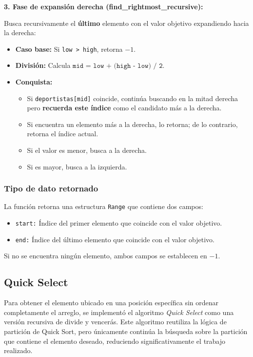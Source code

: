 \textbf{3. Fase de expansión derecha (find\_rightmost\_recursive):}

Busca recursivamente el \textbf{último} elemento con el valor objetivo expandiendo hacia la derecha:

\begin{itemize}
    \item \textbf{Caso base:} Si \texttt{low > high}, retorna $-1$.
    \item \textbf{División:} Calcula \(\texttt{mid = low + (high - low) / 2}\).
    \item \textbf{Conquista:} 
    \begin{itemize}
        \item Si \texttt{deportistas[mid]} coincide, continúa buscando en la mitad derecha pero \textbf{recuerda este índice} como el candidato más a la derecha.
        \item Si encuentra un elemento más a la derecha, lo retorna; de lo contrario, retorna el índice actual.
        \item Si el valor es menor, busca a la derecha.
        \item Si es mayor, busca a la izquierda.
    \end{itemize}
\end{itemize}

\subsubsection{Tipo de dato retornado}

La función retorna una estructura \texttt{Range} que contiene dos campos:

\begin{itemize}
    \item \texttt{start:} Índice del primer elemento que coincide con el valor objetivo.
    \item \texttt{end:} Índice del último elemento que coincide con el valor objetivo.
\end{itemize}

Si no se encuentra ningún elemento, ambos campos se establecen en $-1$.

\subsection{Quick Select}

Para obtener el elemento ubicado en una posición específica sin ordenar completamente el arreglo, se implementó el algoritmo \textit{Quick Select} como una versión recursiva de divide y vencerás. Este algoritmo reutiliza la lógica de partición de Quick Sort, pero únicamente continúa la búsqueda sobre la partición que contiene el elemento deseado, reduciendo significativamente el trabajo realizado.

